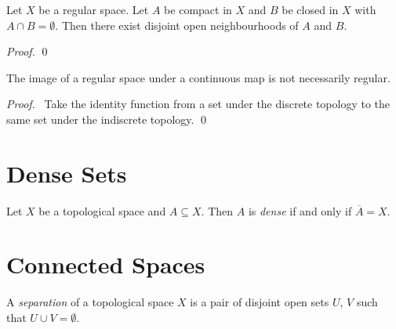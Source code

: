 \begin{proposition}
    \label{proposition:regular_space_compact_closed}
    Let $X$ be a regular space. Let $A$ be compact in $X$ and $B$ be
    closed in $X$ with $A \cap B = \emptyset$. Then there exist
    disjoint open neighbourhoods of $A$ and $B$.
\end{proposition}

\begin{proof}
    \pf
    \qed
\end{proof}

\begin{proposition}
    The image of a regular space under a continuous map is
    not necessarily regular.
\end{proposition}

\begin{proof}
    \pf\ Take the identity function from a set under the
    discrete topology to the same set under the indiscrete topology. \qed
\end{proof}

\section{Dense Sets}

\begin{definition}[Dense]
    Let $X$ be a topological space and $A \subseteq X$. Then $A$ is \emph{dense}
    if and only if $\overline{A} = X$.
\end{definition}

\section{Connected Spaces}

\begin{definition}[Separation]
    A \emph{separation} of a topological space $X$ is a pair of disjoint open sets $U$, $V$ such that $U \cup V = \emptyset$.
\end{definition}

